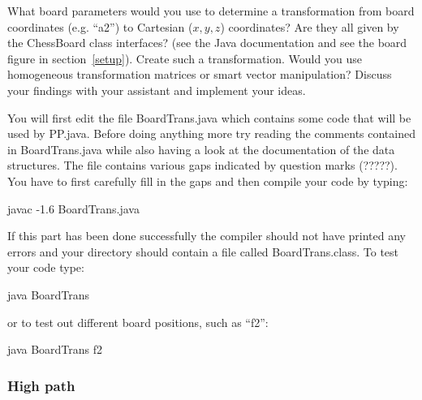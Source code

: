 \documentclass[10pt]{scrartcl}
\begin{document}
What board parameters would you use to determine a transformation from
board coordinates (e.g. ``a2'') to Cartesian ($x,y,z$) coordinates? Are
they all given by the ChessBoard class interfaces? (see the Java
documentation and see the board figure in section~\ref{setup}). Create
such a transformation. Would you use homogeneous transformation
matrices or smart vector manipulation?  Discuss your findings with
your assistant and implement your ideas.


You will first edit the file {\ttfamily\small BoardTrans.java} which
contains some code that will be used by {\ttfamily\small PP.java}.
Before doing anything more try reading the comments contained in
{\ttfamily\small BoardTrans.java} while also having a look at the
documentation of the data structures. The file contains various gaps
indicated by question marks (?????). You have to first carefully fill
in the gaps and then compile your code by typing:

\begin{verbatimtab}
javac -1.6 BoardTrans.java
\end{verbatimtab}

If this part has been done successfully the compiler should not have
printed any errors and your directory should contain a file called
{\ttfamily\small BoardTrans.class}. To test your code type:

\begin{verbatimtab}
java BoardTrans
\end{verbatimtab}

or to test out different board positions, such as ``f2'':

\begin{verbatimtab}
java BoardTrans f2
\end{verbatimtab}


\subsubsection{High path}
  
\end{document}

